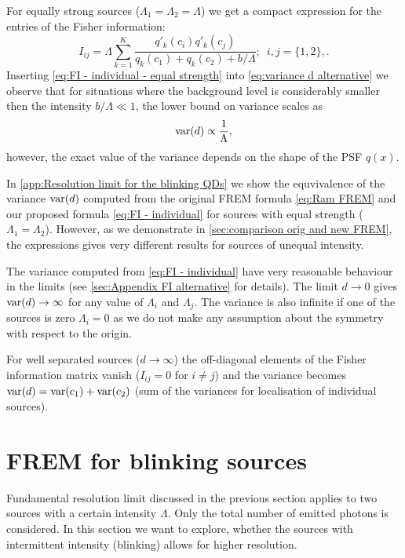 For equally strong sources ($\Lambda_1=\Lambda_2=\Lambda$) we get a compact expression for the entries of the Fisher information: 
%
\begin{equation}
	I_{ij} =\Lambda\sum_{k=1}^{K}\frac{q'_k(c_i)q'_k(c_j)}{q_k(c_1)+q_k(c_2)+b/\Lambda};\; \ i,j=\{1,2\},.
	\label{eq:FI - individual - equal strength}
\end{equation}
%
Inserting \autoref{eq:FI - individual - equal strength} into \autoref{eq:variance d alternative} we observe that for situations where the background level is considerably smaller then the intensity $b/\Lambda\ll1$, the lower bound on variance scales as
%
\begin{equation}
	\mathrm{var}(d)\propto\frac{1}{\Lambda}, 
\end{equation}
%
however, the exact value of the variance depends on the shape of the PSF $q(x)$.

In \autoref{app:Resolution limit for the blinking QDs} we show the equvivalence of the variance $\mathrm{var}(d)$ computed from the original FREM formula \autoref{eq:Ram FREM} and our proposed formula \autoref{eq:FI - individual} for sources with equal strength ($\Lambda_1=\Lambda_2$). However, as we demonstrate in \autoref{sec:comparison orig and new FREM}, the expressions gives very different results for sources of unequal intensity. 

The variance computed from \autoref{eq:FI - individual} have very reasonable behaviour in the limits (see \autoref{sec:Appendix FI alternative} for details). The limit $d\rightarrow0$ gives $\mathrm{var}(d)\rightarrow\infty$ for any value of $\Lambda_i$ and $\Lambda_j$. The variance is also infinite if one of the sources is zero $\Lambda_i=0$ as we do not make any assumption about the symmetry with respect to the origin. 

For well separated sources ($d\rightarrow\infty$) the off-diagonal elements of the Fisher information matrix vanish ($I_{ij}=0$ for $i\neq j$) and the variance becomes $\mathrm{var}(d)=\mathrm{var}(c_1)+\mathrm{var}(c_2)$ (sum of the variances for localisation of individual sources).



\section{FREM for blinking sources}

Fundamental resolution limit discussed in the previous section applies to two sources with a certain intensity $\Lambda$. Only the total number of emitted photons is considered. In this section we want to explore, whether the sources with intermittent intensity (blinking) allows for higher resolution.

